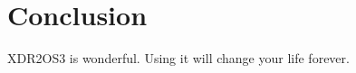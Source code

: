 
\section{Conclusion}
\label{sec:conclusion}

XDR2OS3 is wonderful. Using it will change your life forever.
